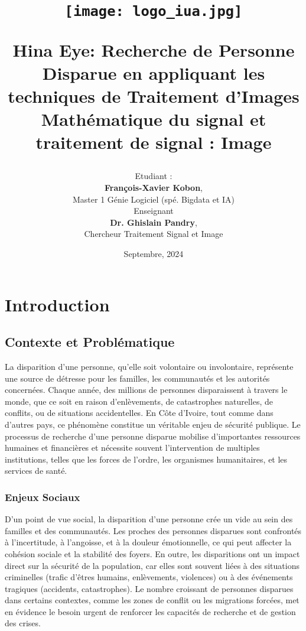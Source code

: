 \documentclass[a4paper,12pt]{report}
\title{
    \begin{figure}
        \centering
        \texttt{[image: logo\_iua.jpg]}
    \end{figure}
    \vspace{1cm}
    \textbf{Hina Eye: Recherche de Personne Disparue en appliquant les techniques de Traitement d'Images} \\
    \large Mathématique du signal et traitement de signal : Image
}
\author{
    \begin{minipage}{0.5\textwidth}
        \raggedright
        Etudiant : \\
        \textbf{François-Xavier Kobon},\\
        Master 1 Génie Logiciel (spé. Bigdata et IA)
    \end{minipage}
    \hfill
    \begin{minipage}{0.5\textwidth}
        \raggedright
        Enseignant \\
        \textbf{Dr. Ghislain Pandry},\\
        Chercheur Traitement Signal et Image
    \end{minipage}
}
\date{Septembre, 2024}
\begin{document}
\maketitle

\tableofcontents
\newpage

\chapter*{Introduction}
\section*{Contexte et Problématique}
La disparition d’une personne, qu’elle soit volontaire ou involontaire, représente une source de détresse pour les familles, les communautés et les autorités concernées. Chaque année, des millions de personnes disparaissent à travers le monde, que ce soit en raison d'enlèvements, de catastrophes naturelles, de conflits, ou de situations accidentelles. En Côte d'Ivoire, tout comme dans d'autres pays, ce phénomène constitue un véritable enjeu de sécurité publique. Le processus de recherche d'une personne disparue mobilise d'importantes ressources humaines et financières et nécessite souvent l'intervention de multiples institutions, telles que les forces de l’ordre, les organismes humanitaires, et les services de santé.

\subsection*{Enjeux Sociaux}
D'un point de vue social, la disparition d'une personne crée un vide au sein des familles et des communautés. Les proches des personnes disparues sont confrontés à l'incertitude, à l'angoisse, et à la douleur émotionnelle, ce qui peut affecter la cohésion sociale et la stabilité des foyers. En outre, les disparitions ont un impact direct sur la sécurité de la population, car elles sont souvent liées à des situations criminelles (trafic d’êtres humains, enlèvements, violences) ou à des événements tragiques (accidents, catastrophes). Le nombre croissant de personnes disparues dans certains contextes, comme les zones de conflit ou les migrations forcées, met en évidence le besoin urgent de renforcer les capacités de recherche et de gestion des crises.
\end{document}
